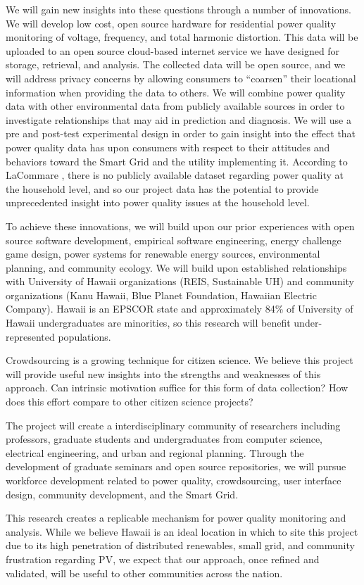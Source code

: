 We will gain new insights into these questions through a number of innovations.  We will develop low cost, open source hardware for residential power quality monitoring of voltage, frequency, and total harmonic distortion. This data will be uploaded to an open source cloud-based internet service we have designed for storage, retrieval, and analysis. The collected data will be open source, and we will address privacy concerns by allowing consumers to ``coarsen'' their locational information when providing the data to others.  We will combine power quality data with other environmental data from publicly available sources in order to investigate relationships that may aid in prediction and diagnosis.  We will use a pre and post-test experimental design in order to gain insight into the effect that power quality data has upon consumers with respect to their attitudes and behaviors toward the Smart Grid and the utility implementing it.  According to LaCommare \cite{LaCommare2004}, there is no publicly available dataset regarding power quality at the household level, and so our project data has the potential to provide unprecedented insight into power quality issues at the household level.

To achieve these innovations, we will build upon our prior experiences with open source software development, empirical software engineering, energy challenge game design, power systems for renewable energy sources, environmental planning, and community ecology. We will build upon established relationships with University of Hawaii organizations (REIS, Sustainable UH) and community organizations (Kanu Hawaii, Blue Planet Foundation, Hawaiian Electric Company).  Hawaii is an EPSCOR state and approximately 84\% of University of Hawaii undergraduates are minorities, so this research will benefit under-represented populations.

Crowdsourcing is a growing technique for citizen science. We believe this project will provide useful new insights into the strengths and weaknesses of this approach. Can intrinsic motivation suffice for this form of data collection? How does this effort compare to other citizen science projects? 

The project will create a interdisciplinary community of researchers including professors, graduate students and undergraduates from computer science, electrical engineering, and urban and regional planning.  Through the development of graduate seminars and open source repositories, we will pursue workforce development related to power quality, crowdsourcing, user interface design, community development, and the Smart Grid.

This research creates a replicable mechanism for power quality monitoring and analysis. While we believe Hawaii is an ideal location in which to site this project due to its high penetration of distributed renewables, small grid, and community frustration regarding PV, we expect that our approach, once refined and validated, will be useful to other communities across the nation. 




